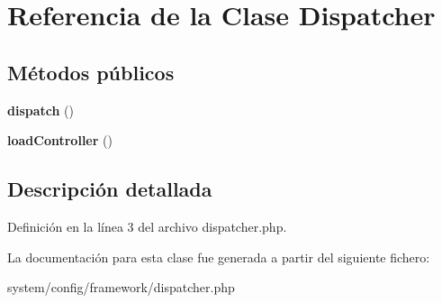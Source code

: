 \hypertarget{class_dispatcher}{}\section{Referencia de la Clase Dispatcher}
\label{class_dispatcher}
\subsection*{Métodos públicos}
\begin{DoxyCompactItemize}
\item 
\mbox{\label{class_dispatcher_af79aa0f7056d4bc6765f940a9a0fb039}} 
{\bfseries dispatch} ()
\item 
\mbox{\label{class_dispatcher_a4881c5f9c9949c71632cd659fae77bc1}} 
{\bfseries load\+Controller} ()
\end{DoxyCompactItemize}


\subsection{Descripción detallada}


Definición en la línea 3 del archivo dispatcher.\+php.



La documentación para esta clase fue generada a partir del siguiente fichero\+:\begin{DoxyCompactItemize}
\item 
system/config/framework/dispatcher.\+php\end{DoxyCompactItemize}
